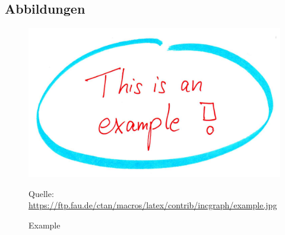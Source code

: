 \subsection{Abbildungen}

\begin{figure}[H]
	\centering
	\includegraphics[width=15cm]{bilder/example.jpg}
	\caption{Example}
	\label{abb:example}
	Quelle: \url{https://ftp.fau.de/ctan/macros/latex/contrib/incgraph/example.jpg}
\end{figure}

